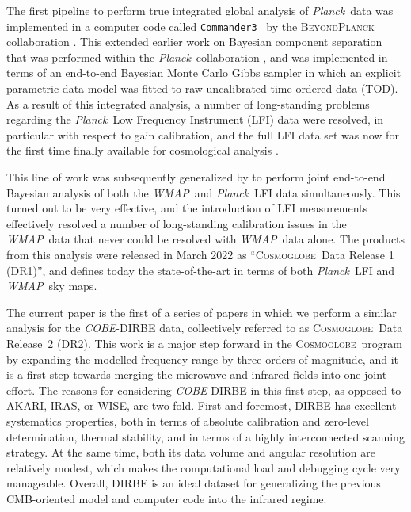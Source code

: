 \documentclass{aa}
\def\Cosmoglobe{\textsc{Cosmoglobe}}
\def\commanderthree{\texttt{Commander3}}
\def\Planck{\textit{Planck}}
\def\WMAP{\textit{WMAP}}
\def\COBE{\textit{COBE}}
\def\AKARI{\textrm{{AKARI}}}
\def\IRAS{\textrm{{IRAS}}}
\newcommand{\cosmoglobe}{\textsc{Cosmoglobe}}
\begin{document}
The first pipeline to perform true integrated global analysis of \Planck\ data was implemented in a computer code called \commanderthree\ \citep{bp03} by the \textsc{BeyondPlanck} collaboration \citep{bp01}. This extended earlier work on Bayesian component separation that was performed within the \Planck\ collaboration \citep{planck2014-a12}, and was implemented in terms of an end-to-end Bayesian Monte Carlo Gibbs sampler in which an explicit parametric data model was fitted to raw uncalibrated time-ordered data (TOD). As a result of this integrated analysis, a number of long-standing problems regarding the \Planck\ Low Frequency Instrument (LFI) data \citep{planck2016-l02} were resolved, in particular with respect to gain calibration, and the full LFI data set was now for the first time finally available for cosmological analysis \citep{bp10,bp11,bp12}.

This line of work was subsequently generalized by \citet{watts2023_dr1} to perform joint end-to-end Bayesian analysis of both the \WMAP\ and \Planck\ LFI data simultaneously. This turned out to be very effective, and the introduction of LFI measurements effectively resolved a number of long-standing calibration issues in the \WMAP\ data that never could be resolved with \WMAP\ data alone. The products from this analysis were released in March 2022 as ``\Cosmoglobe\ Data Release 1 (DR1)'', and defines today the state-of-the-art in terms of both \Planck\ LFI and \WMAP\ sky maps.

The current paper is the first of a series of papers in which we perform a similar analysis for the \COBE-DIRBE data, collectively referred to as \cosmoglobe\ Data Release~2 (DR2). This work is a major step forward in the \Cosmoglobe\ program by expanding the modelled frequency range by three orders of magnitude, and it is a first step towards merging the microwave and infrared fields into one joint effort. The reasons for considering \COBE-DIRBE in this first step, as opposed to \AKARI, \IRAS, or WISE, are two-fold. First and foremost, DIRBE has excellent systematics properties, both in terms of absolute calibration and zero-level determination, thermal stability, and in terms of a highly interconnected scanning strategy. At the same time, both its data volume and angular resolution are relatively modest, which  makes the computational load and debugging cycle very manageable. Overall, DIRBE is an ideal dataset for generalizing the previous CMB-oriented model and computer code into the infrared regime.
\end{document}
